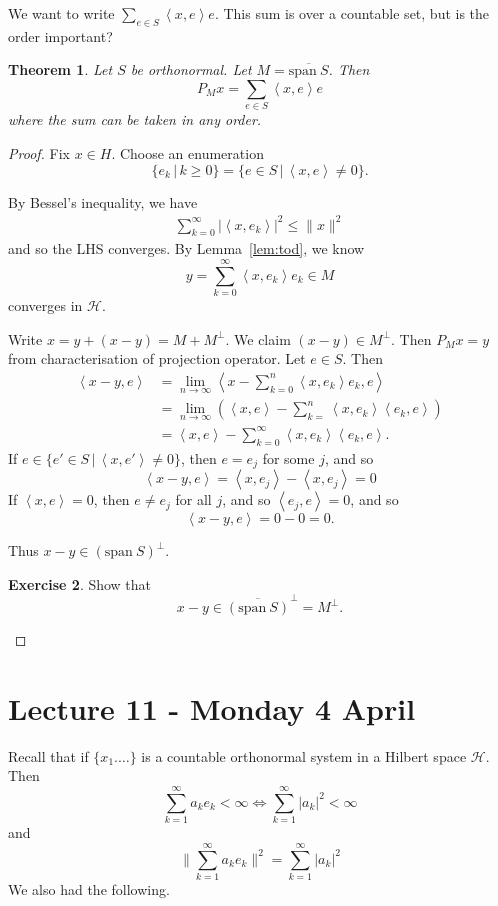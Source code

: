 \documentclass[10pt, oneside, reqno]{amsart}
\theoremstyle{plain}%
\newtheorem{thm}{Theorem}[section]
\theoremstyle{definition}
\newtheorem{exer}[thm]{Exercise}
\theoremstyle{remark}
\newcommand{\Hil}{\mathcal{H}}
\newcommand{\iprod}[1]{\left\langle #1 \right\rangle}
\newcommand{\spans}{\text{span}\ }
\begin{document}
We want to write $\sum_{e \in S} \iprod{x,e} e$.  This sum is over a countable set, but is the order important?

\begin{thm}
    Let $S$ be orthonormal.  Let $M = \overline{\spans S}$.  Then \[
        P_M x = \sum_{e \in S} \iprod{x,e} e
    \] where the sum can be taken in any order.
\end{thm}
\begin{proof}
    Fix $x \in H$.  Choose an enumeration $$\{ e_k \, | \, k \geq 0 \} = \{ e \in S \, | \, \iprod{x,e} \neq 0 \}.$$
    
    By Bessel's inequality, we have \begin{align*}
        \sum_{k=0}^\infty | \iprod{x, e_k} |^2 \leq \| x \|^2
    \end{align*} and so the LHS converges.  By Lemma~\ref{lem:tod}, we know \[
        y = \sum_{ k = 0}^\infty \iprod{x,e_k} e_k \in M
    \] converges in $\Hil$.  
    
    Write $x = y + (x-y) = M + M^\perp$.  We claim $(x-y) \in M^\perp$.  Then $P_Mx = y$ from characterisation of projection operator.  Let $e \in S$.  Then \begin{align*}
        \iprod{x-y, e} &= \lim_{n \rightarrow \infty} \iprod{ x - \sum_{k=0}^n \iprod{x, e_k} e_k, e} \\    
        &= \lim_{n \rightarrow \infty} ( \iprod{x,e} - \sum_{k=}^n \iprod{x, e_k} \iprod{e_k, e}) \\
        &= \iprod{x,e} - \sum_{k=0}^\infty \iprod{x, e_k} \iprod{e_k, e}.
    \end{align*}
    If $e \in \{ e' \in S \, | \, \iprod{x, e'} \neq 0 \}$, then $e = e_j$ for some $j$, and so \[
        \iprod{x-y, e} = \iprod{x, e_j} - \iprod{x, e_j} = 0
    \]  
    If $\iprod{x,e} = 0$, then $e \neq e_j$ for all $j$, and so $\iprod{e_j, e} = 0$, and so \[
        \iprod{x-y, e} = 0 - 0 = 0.
    \]
    
    Thus $x-y \in (\spans S)^\perp$.
    
    \begin{exer}
        Show that \[
            x-y \in \overline{(\spans S)}^\perp = M^\perp.
        \]
    \end{exer}
\end{proof}


\section{Lecture 11 - Monday 4 April} %
\label{sec:lecture_11_monday_4_april}
Recall that if $\{ x_1. \dots \}$ is a countable orthonormal system in a Hilbert space $\Hil$.  Then \[
    \sum_{k=1}^\infty a_k e_k < \infty \iff \sum_{k=1}^\infty |a_k|^2 < \infty 
\] and \[
    \| \sum_{k=1}^\infty a_k e_k \|^2 = \sum_{k=1}^\infty |a_k|^2 \tag{$\star$}
\] We also had the following.
\end{document}
